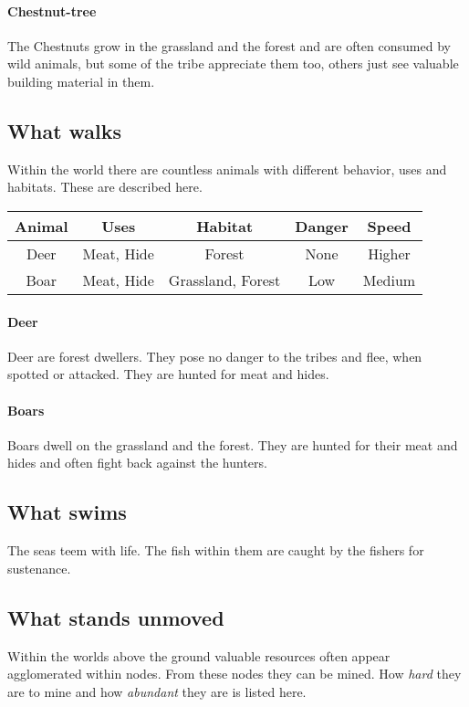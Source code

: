 \documentclass[a4paper]{book}
\begin{document}
\paragraph{Chestnut-tree}
The Chestnuts grow in the grassland and the forest and are often
consumed by wild animals, but some of the tribe appreciate them too,
others just see valuable building material in them.

\subsection{What walks}
Within the world there are countless animals with different behavior,
uses and habitats.
These are described here.

\begin{longtable}{ccccc}
	\toprule
	Animal & Uses & Habitat & Danger & Speed \\
	\midrule
	Deer & Meat, Hide & Forest & None  & Higher \\
	Boar & Meat, Hide & Grassland, Forest & Low & Medium \\
	\bottomrule
\end{longtable}

\paragraph{Deer}
Deer are forest dwellers.
They pose no danger to the tribes and flee, 
when spotted or attacked.
They are hunted for meat and hides.

\paragraph{Boars}
Boars dwell on the grassland and the forest.
They are hunted for their meat and hides
and often fight back against the hunters.

\subsection{What swims}
The seas teem with life.
The fish within them are caught by the fishers for sustenance.

\subsection{What stands unmoved}
Within the worlds above the ground valuable resources often appear
agglomerated within nodes.
From these nodes they can be mined.
How \emph{hard} they are to mine and how \emph{abundant} they
are is listed here.
\end{document}
